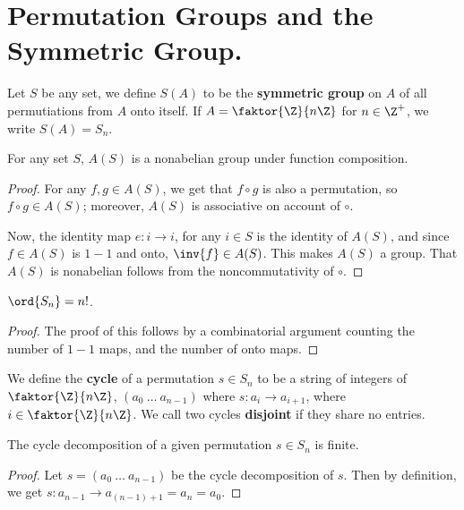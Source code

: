 \section{Permutation Groups and the Symmetric Group.}
\label{section1}

\begin{definition}
    Let $S$ be any set, we define $S(A)$ to be the \textbf{symmetric group} on
    $A$ of all permutiations from  $A$ onto itself. If  $A=\faktor{\Z}{n\Z}$ for
    $n \in \Z^+$, we write $S(A)=S_n$.
\end{definition}

\begin{theorem}\label{1.4.1}
    For any set $S$, $A(S)$ is a nonabelian group under function composition.
\end{theorem}
\begin{proof}
    For any $f,g \in A(S)$, we get that $f \circ g$ is also a permutation, so
    $f \circ g \in A(S)$; moreover, $A(S)$ is associative on account of $\circ$.

    Now, the identity map $e:i \rightarrow i$, for any $i \in S$ is the identity
    of $A(S)$, and since $f \in A(S)$ is $1-1$ and onto,  $\inv{f} \in A(S)$.
    This makes $A(S)$ a group. That $A(S)$ is nonabelian follows from the
    noncommutativity of $\circ$.
\end{proof}
\begin{corollary}
    $\ord{S_n}=n!$.
\end{corollary}
\begin{proof}
    The proof of this follows by a combinatorial argument counting the number of
    $1-1$ maps, and the number of onto maps.
\end{proof}

\begin{definition}
    We define the \textbf{cycle} of a permutation $s \in S_n$ to be a string of
    integers of  $\faktor{\Z}{n\Z}$, $(a_0 \ \dots \ a_{n-1})$ where $s:a_i
    \rightarrow a_{i+1}$, where $i \in \faktor{\Z}{n\Z}$. We call two cycles
    \textbf{disjoint} if they share no entries.
\end{definition}

\begin{lemma}\label{1.4.2}
    The cycle decomposition of a given permutation $s \in S_n$ is finite.
\end{lemma}
\begin{proof}
    Let $s=(a_0 \ \dots  \ a_{n-1})$ be the cycle decomposition of $s$. Then by
    definition, we get  $s:a_{n-1} \rightarrow a_{(n-1)+1}=a_n=a_0$.
\end{proof}

